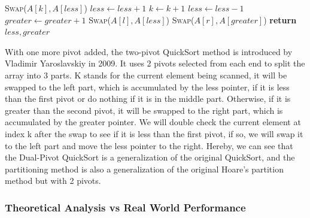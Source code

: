 \documentclass[a4paper,oneside,12pt]{book}
\begin{document}
\begin{algorithm}[H]
\begin{algorithmic}[1]
                 
                    \State \textsc{Swap}($A[k], A[less]$) 
                    \State $less \gets less + 1$
                \EndIf
            \EndIf
            \State $k \gets k + 1$ 
        \EndWhile
        \State $less \gets less - 1$
        \State $greater \gets greater + 1$
        \State \textsc{Swap}($A[l], A[less]$) 
        \State \textsc{Swap}($A[r], A[greater]$) 
        \State \textbf{return} $less, greater$
        \EndProcedure
    \end{algorithmic}
\end{algorithm}

With one more pivot added, the two-pivot QuickSort method is introduced by Vladimir Yaroslavskiy in 2009. It uses 2 pivots selected from each end to split the array into 3 parts.
K stands for the current element being scanned, it will be swapped to the left part, which is accumulated by the less pointer, if it is less than the first pivot or do nothing if it is in the middle part.
Otherwise, if it is greater than the second pivot, it will be swapped to the right part, which is accumulated by the greater pointer.
We will double check the current element at index k after the swap to see if it is less than the first pivot, if so, we will swap it to the left part and move the less pointer to the right.
Hereby, we can see that the Dual-Pivot QuickSort is a generalization of the original QuickSort, and the partitioning method is also a generalization of the original Hoare's partition method but with 2 pivots.

\subsubsection{Theoretical Analysis vs Real World Performance}
\end{document}
